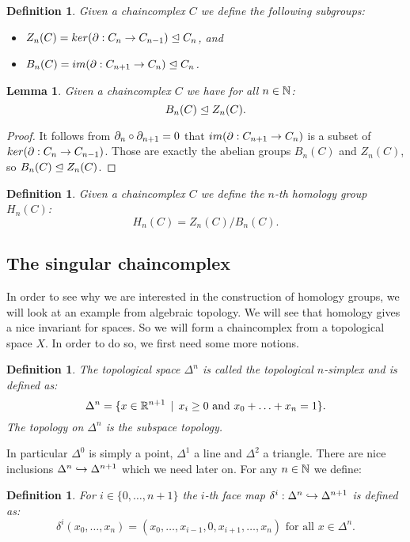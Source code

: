 \documentclass[12pt]{amsproc}
\newtheorem{definition}[theorem]{Definition}
\newtheorem{lemma}[theorem]{Lemma}
\begin{document}
\begin{definition}
	Given a chaincomplex $C$ we define the following subgroups:
	\begin{itemize}
		\item $Z_n(C) = ker(\partial: C_n \to C_{n-1}) \trianglelefteq C_n$, and
		\item $B_n(C) = im(\partial: C_{n+1} \to C_n) \trianglelefteq C_n$.
	\end{itemize}
\end{definition}
\begin{lemma}
	Given a chaincomplex $C$ we have for all $n \in \mathbb{N}$:
	$$ B_n(C) \trianglelefteq Z_n(C).$$
\end{lemma}
\begin{proof}
	It follows from $\partial_n \circ \partial_{n+1} = 0$ that $im(\partial: C_{n+1} \to C_n)$ is a subset of $ker(\partial: C_n \to C_{n-1})$. Those are exactly the abelian groups $B_n(C)$ and $Z_n(C)$, so $ B_n(C) \trianglelefteq Z_n(C) $.
\end{proof}
\begin{definition}
	Given a chaincomplex $C$ we define the \emph{$n$-th homology group} $H_n(C)$:
	$$ H_n(C) = Z_n(C) / B_n(C).$$
\end{definition}

\subsection{The singular chaincomplex}
In order to see why we are interested in the construction of homology groups, we will look at an example from algebraic topology. We will see that homology gives a nice invariant for spaces. So we will form a chaincomplex from a topological space $X$. In order to do so, we first need some more notions.
\begin{definition}
	The topological space $\Delta^n$ is called the \emph{topological $n$-simplex} and is defined as:
	$$ \Delta^n = \{x \in \mathbb{R}^{n+1} \,\mid\, x_i \geq 0 \text{ and } x_0 + \ldots + x_n = 1 \}.$$
	The topology on $\Delta^n$ is the subspace topology.
\end{definition}

In particular $\Delta^0$ is simply a point, $\Delta^1$ a line and $\Delta^2$ a triangle. There are nice inclusions $\Delta^n \hookrightarrow \Delta^{n+1}$ which we need later on. For any $n \in \mathbb{N}$ we define:
\begin{definition}
	For $i \in \{0, \ldots, n+1\}$ the $i$-th face map $\delta^i : \Delta^n \hookrightarrow \Delta^{n+1}$ is defined as:
	$$ \delta^i (x_0, \ldots, x_n) = (x_0, \ldots, x_{i-1}, 0, x_{i+1}, \ldots, x_n) \text{ for all } x \in \Delta^n.$$
\end{definition}
\end{document}
